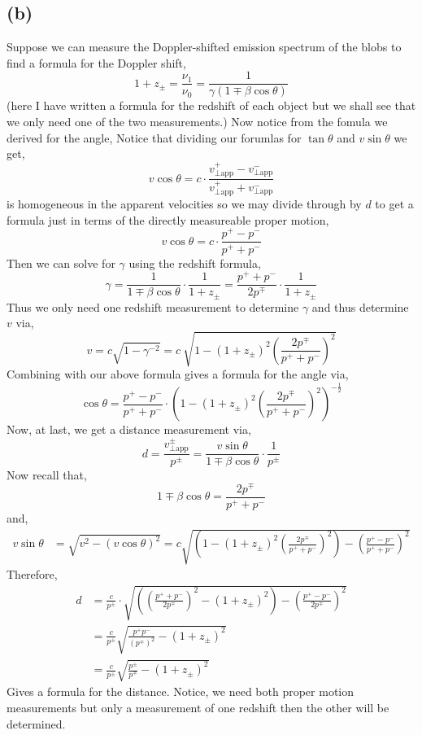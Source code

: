 \documentclass[12pt]{article}
\begin{document}
\subsection*{(b)}

Suppose we can measure the Doppler-shifted emission spectrum of the blobs to find a formula for the Doppler shift,
\[ 1 + z_{\pm} = \frac{\nu_1}{\nu_0} = \frac{1}{\gamma(1 \mp \beta \cos{\theta})} \]
(here I have written a formula for the redshift of each object but we shall see that we only need one of the two measurements.)
Now notice from the fomula we derived for the angle,
Notice that dividing our forumlas for $\tan{\theta}$ and $v \sin{\theta}$ we get,
\[ v \cos{\theta} = c \cdot \frac{v_{\perp \text{app}}^{+} - v_{\perp \text{app}}^{-}}{v_{\perp \text{app}}^{+} + v_{\perp \text{app}}^{-}} \]
is homogeneous in the apparent velocities so we may divide through by $d$ to get a formula just in terms of the directly measureable proper motion,
\[ v \cos{\theta} = c \cdot \frac{p^{+} - p^{-}}{p^{+} + p^{-}} \]
Then we can solve for $\gamma$ using the redshift formula,
\[ \gamma = \frac{1}{1 \mp \beta \cos{\theta}} \cdot \frac{1}{1 + z_{\pm}} = \frac{p^{+} + p^{-}}{2 p^{\mp}} \cdot \frac{1}{1 + z_{\pm}} \]
Thus we only need one redshift measurement to determine $\gamma$ and thus determine $v$ via,
\[ v = c \sqrt{1 - \gamma^{-2}} = c \: \sqrt{1 - (1 + z_{\pm})^2 \left( \frac{2 p^{\mp}}{p^{+} + p^{-}} \right)^2} \]
Combining with our above formula gives a formula for the angle via,
\[ \cos{\theta} = \frac{p^{+} - p^{-}}{p^{+} + p^{-}} \cdot \left( 1 - (1 + z_{\pm})^2 \left( \frac{2 p^{\mp}}{p^{+} + p^{-}} \right)^2 \right)^{-\frac{1}{2}} \]
Now, at last, we get a distance measurement via,
\[ d = \frac{ v_{\perp \text{app}}^{\pm}}{p^{\pm}} = \frac{v \sin{\theta}}{1 \mp \beta \cos{\theta}} \cdot \frac{1}{p^{\pm}} \]
Now recall that,
\[ 1 \mp \beta \cos{\theta} = \frac{2 p^{\mp}}{p^{+} + p^{-}} \]
and,
\begin{align*}
v \sin{\theta} & = \sqrt{v^2 - (v \cos{\theta})^2} = c \sqrt{ \left( 1 - (1 + z_{\pm})^2 \left( \frac{2 p^{\mp}}{p^{+} + p^{-}} \right)^2 \right) - \left( \frac{p^{+} - p^{-}}{p^{+} + p^{-}} \right)^2}
\end{align*}
Therefore,
\begin{align*}
d & = \frac{c}{p^{\pm}} \cdot \sqrt{ \left( \left( \frac{p^{+} + p^{-}}{2 p^{\mp}} \right)^2  - (1 + z_{\pm})^2 \right) - \left( \frac{p^{+} - p^{-}}{2 p^{\mp}} \right)^2} 
\\
& = \frac{c}{p^{\pm}} \sqrt{ \frac{p^{+} p^{-}}{(p^{\mp})^2} - (1 + z_{\pm})^2 }
\\
& = \frac{c}{p^{\pm}} \sqrt{ \frac{p^{\pm}}{p^{\mp}} - (1 + z_{\pm})^2 }
\end{align*}
Gives a formula for the distance. Notice, we need both proper motion measurements but only a measurement of one redshift then the other will be determined. 
\end{document}
